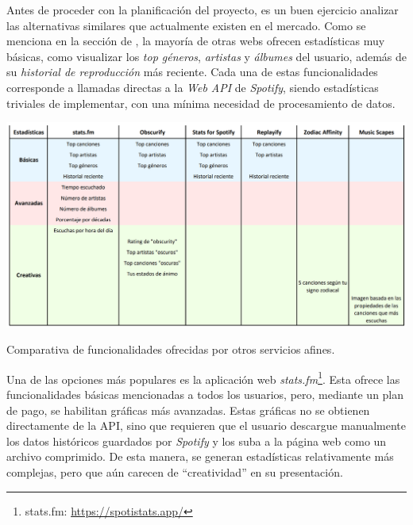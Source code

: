 
Antes de proceder con la planificación del proyecto, es un buen ejercicio analizar las alternativas similares que actualmente existen en el mercado. Como se menciona en la sección de , la mayoría de otras webs ofrecen estadísticas muy básicas, como visualizar los \textit{top géneros}, \textit{artistas} y \textit{álbumes} del usuario, además de su \textit{historial de reproducción} más reciente. Cada una de estas funcionalidades corresponde a llamadas directas a la \textit{Web API} de \textit{Spotify}, siendo estadísticas triviales de implementar, con una mínima necesidad de procesamiento de datos.

\vspace{0.5cm}

\begin{table}[htbp]
    \centering
    \includegraphics[width=\textwidth]{figures/tabla_comparativa.png}
    \caption{Comparativa de funcionalidades ofrecidas por otros servicios afines.}
    \label{tab:comparativa}
\end{table}

\vspace{0.5cm}

Una de las opciones más populares es la aplicación web \textit{stats.fm}\footnote{stats.fm: \url{https://spotistats.app/}}. Esta ofrece las funcionalidades básicas mencionadas a todos los usuarios, pero, mediante un plan de pago, se habilitan gráficas más avanzadas. Estas gráficas no se obtienen directamente de la API, sino que requieren que el usuario descargue manualmente los datos históricos guardados por \textit{Spotify} y los suba a la página web como un archivo comprimido. De esta manera, se generan estadísticas relativamente más complejas, pero que aún carecen de ``creatividad'' en su presentación.

